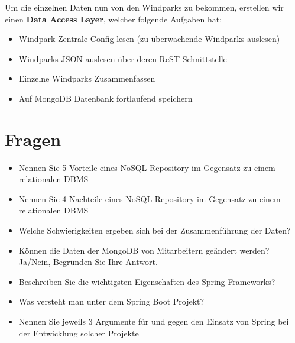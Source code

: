 Um die einzelnen Daten nun von den Windparks zu bekommen, erstellen wir einen \textbf{Data Access Layer}, welcher folgende Aufgaben hat:

\begin{itemize}
    \item Windpark Zentrale Config lesen (zu überwachende Windparks auslesen)
    \item Windparks JSON auslesen über deren ReST Schnittstelle
    \item Einzelne Windparks Zusammenfassen
    \item Auf MongoDB Datenbank fortlaufend speichern
\end{itemize}






\clearpage
\section{Fragen}

\begin{itemize}
    \item Nennen Sie 5 Vorteile eines NoSQL Repository im Gegensatz zu einem relationalen DBMS
    \item Nennen Sie 4 Nachteile eines NoSQL Repository im Gegensatz zu einem relationalen DBMS
    \item Welche Schwierigkeiten ergeben sich bei der Zusammenführung der Daten?
    \item Können die Daten der MongoDB von Mitarbeitern geändert werden?
        Ja/Nein, Begründen Sie Ihre Antwort.
    \item Beschreiben Sie die wichtigsten Eigenschaften des Spring Frameworks?
    \item Was versteht man unter dem Spring Boot Projekt?
    \item Nennen Sie jeweils 3 Argumente für und gegen den Einsatz von Spring bei der Entwicklung solcher Projekte
\end{itemize}
